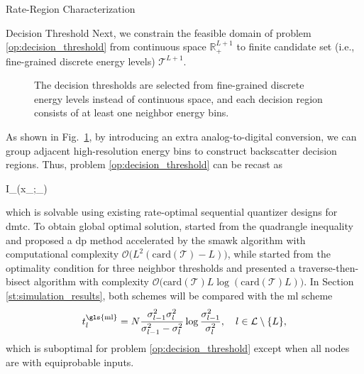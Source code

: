 \documentclass[journal,12pt,onecolumn,draftclsnofoot]{IEEEtran}
\theoremstyle{remark}
\begin{document}
\begin{section}{Rate-Region Characterization}
\begin{subsection}{Decision Threshold}
		Next, we constrain the feasible domain of problem \eqref{op:decision_threshold} from continuous space $\mathbb{R}_+^{L+1}$ to finite candidate set (i.e., fine-grained discrete energy levels) $\mathcal{T}^{L+1}$.
		\begin{figure}[!t]
			\centering
			\resizebox{0.5\columnwidth}{!}{
				
			}
			\caption{The decision thresholds are selected from fine-grained discrete energy levels instead of continuous space, and each decision region consists of at least one neighbor energy bins.}
			\label{fg:discrete_outputs}
		\end{figure}
		As shown in Fig.~\ref{fg:discrete_outputs}, by introducing an extra analog-to-digital conversion, we can group adjacent high-resolution energy bins to construct backscatter decision regions.
		Thus, problem \eqref{op:decision_threshold} can be recast as
		\begin{maxi!}
			{}{I_{}(x_{};_{})}{\label{op:decision_threshold_discrete}}{\label{ob:decision_threshold_discrete}}
			\addConstraint{\eqref{co:sequential_threshold},}
		\end{maxi!}
		which is solvable using existing rate-optimal sequential quantizer designs for \gls{dmtc}.
		To obtain global optimal solution, \cite{He2021} started from the quadrangle inequality and proposed a \gls{dp} method accelerated by the \gls{smawk} algorithm with computational complexity $\mathcal{O}\bigl(L^2(\mathrm{card}(\mathcal{T})-L)\bigr)$, while \cite{Nguyen2020a} started from the optimality condition for three neighbor thresholds and presented a traverse-then-bisect algorithm with complexity $\mathcal{O}\bigl(\mathrm{card}(\mathcal{T})L\log(\mathrm{card}(\mathcal{T})L)\bigr)$.
		In Section \ref{st:simulation_results}, both schemes will be compared with the \gls{ml} scheme \cite{Qian2019}
		\begin{equation}
			t_{l}^{\text{\gls{ml}}} = N \frac{\sigma_{l-1}^2 \sigma_{l}^2}{\sigma_{l-1}^2 - \sigma_{l}^2} \log \frac{\sigma_{l-1}^2}{\sigma_{l}^2}, \quad l \in \mathcal{L} \setminus \{L\},
			\label{eq:detection_threshold_ml}
		\end{equation}
		which is suboptimal for problem \eqref{op:decision_threshold} except when all nodes are with equiprobable inputs.
	\end{subsection}
\end{section}
\end{document}
